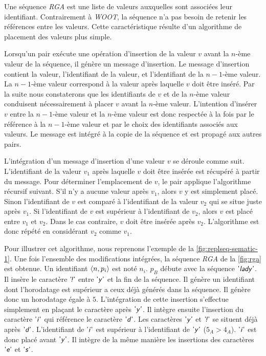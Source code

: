 Une séquence \emph{RGA} est une liste de valeurs auxquelles sont associées leur identifiant.
Contrairement à \emph{WOOT}, la séquence n'a pas besoin de retenir les références entre les valeurs.
Cette caractéristique résulte d'un algorithme de placement des valeurs plus simple.

Lorsqu'un pair exécute une opération d'insertion de la valeur $v$ avant la $n$-ème valeur de la séquence, il génère un message d'insertion.
Le message d'insertion contient la valeur, l'identifiant de la valeur, et l'identifiant de la $n-1$-ème valeur.
La $n-1$-ème valeur correspond à la valeur après laquelle $v$ doit être inséré.
Par la suite nous constaterons que les identifiants de $v$ et de la $n$-ème valeur conduisent nécessairement à placer $v$ avant la $n$-ème valeur.
L'intention d'insérer $v$ entre la $n-1$-ème valeur et la $n$-ème valeur est donc respectée à la fois par le référence à la $n-1$-ème valeur et par le choix des identifiants associés aux valeurs.
Le message est intégré à la copie de la séquence et est propagé aux autres pairs.

L'intégration d'un message d'insertion d'une valeur $v$ se déroule comme suit.
L'identifiant de la valeur $v_1$ après laquelle $v$ doit être insérée est récupéré à partir du message.
Pour déterminer l'emplacement de $v$, le pair applique l'algorithme récursif suivant.
S'il n'y a aucune valeur après $v_1$, alors $v$ y est simplement placé.
Sinon l'identifiant de $v$ est comparé à l'identifiant de la valeur $v_2$ qui se situe juste après $v_1$.
Si l'identifiant de $v$ est supérieur à l'identifiant de $v_2$, alors $v$ est placé entre $v_1$ et $v_2$.
Dans le cas contraire, $v$ doit être insérée après $v_2$.
L'algorithme est donc répété en considérant $v_2$ comme $v_1$.

Pour illustrer cet algorithme, nous reprenons l'exemple de la \autoref{fig:replseq-sematic-1}.
Une fois l'ensemble des modifications intégrées, la séquence \emph{RGA} de la \autoref{fig:rga} est obtenue.
Un identifiant $\tuple*{n, p_i}$ est noté $n_i$.
$p_B$ débute avec la séquence $\textsf{'\textit{lady}'}$.
Il insère le caractère $\textsf{'\textit{\negthinspace!}'}$ entre $\textsf{'\textit{y}'}$ et la fin de la séquence.
Il génère un identifiant dont l'horodatage est supérieur a ceux déjà générés dans la séquence.
Il génère donc un horodatage égale à $5$.
L'intégration de cette insertion s'effectue simplement en plaçant le caractère après $\textsf{'\textit{y}'}$.
Il intègre ensuite l'insertion du caractère $\textsf{'\textit{i}'}$ qui référence le caractère $\textsf{'\textit{d}'}$.
Les caractères $\textsf{'\textit{y}'}$ et $\textsf{'\textit{\negthinspace!}'}$ se situent déjà après $\textsf{'\textit{d}'}$.
L'identifiant de $\textsf{'\textit{i}'}$ est supérieur à l'identifiant de $\textsf{'\textit{y}'}$ ($5_A > 4_A$).
$\textsf{'\textit{i}'}$ est donc placé avant $\textsf{'\textit{y}'}$.
Il intègre de la même manière les insertions des caractères $\textsf{'\textit{e}'}$ et $\textsf{'\textit{s}'}$.


